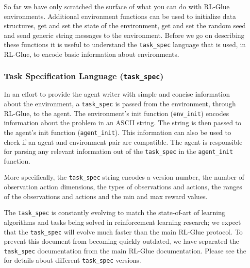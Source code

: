 \documentclass[11pt]{article}
\begin{document}
So far we have only scratched the surface of what you can do with RL-Glue environments. Additional environment functions can be used to initialize data structures, get and set the state of the environment, get and set the random seed and send generic string messages to the environment. Before we go on describing these functions it is useful to understand the \texttt{task\_spec} language that is used, in RL-Glue, to encode basic information about environments. 

\subsubsection{Task Specification Language (\texttt{task\_spec})}
\label{task}
In an effort to provide the agent writer with simple and concise information about the environment, a \texttt{task\_spec} is passed from the environment, through RL-Glue, to the agent. The environment's init function (\texttt{env\_init}) encodes information about the problem in an ASCII string. The string is then passed to the agent's init function (\texttt{agent\_init}).  This information can also be used to check if an agent and environment pair are compatible. The agent is responsible for parsing any relevant information out of the \texttt{task\_spec} in the \texttt{agent\_init}  function. 

More specifically, the \texttt{task\_spec} string encodes a version number, the number of observation action dimensions, the types of observations and actions, the ranges of the observations and actions and the min and max reward values. 

The \texttt{task\_spec} is constantly evolving to match the state-of-art of learning algorithms and tasks being solved in reinforcement learning research; we expect that the \texttt{task\_spec} will evolve much faster than the main RL-Glue protocol.  To prevent this document from becoming quickly outdated, we have separated the \texttt{task\_spec} documentation from the main RL-Glue documentation. Please see the  for details about different \texttt{task\_spec} versions.
\end{document}
